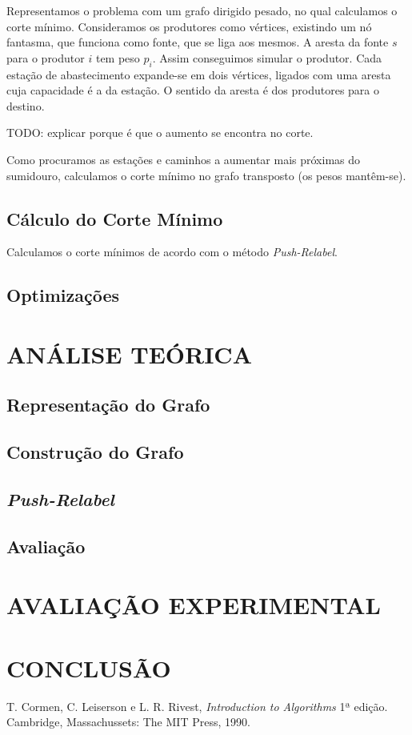 \documentclass[a4paper, 12pt, conference, portuguese]{ieeeconf}
\begin{document}
Representamos o problema com um grafo dirigido pesado, no qual
calculamos o corte mínimo. Consideramos os produtores como
vértices, existindo um nó fantasma, que funciona como fonte, que
se liga aos mesmos. A aresta da fonte $s$ para o produtor $i$ tem
peso $p_i$. Assim conseguimos simular o produtor. Cada estação de
abastecimento expande-se em dois vértices, ligados com uma aresta
cuja capacidade é a da estação. O sentido da aresta é dos produtores
para o destino.

TODO: explicar porque é que o aumento se encontra no corte.

Como procuramos as estações e caminhos a aumentar mais próximas
do sumidouro, calculamos o corte mínimo no grafo transposto (os
pesos mantêm-se).

\subsection{Cálculo do Corte Mínimo}
Calculamos o corte mínimos de acordo com o método
\textit{Push-Relabel}.
\subsection{Optimizações}

\section{ANÁLISE TEÓRICA}\label{theoric}

\subsection{Representação do Grafo}
\subsection{Construção do Grafo}
\subsection{\textit{Push-Relabel}}
\subsection{Avaliação}

\section{AVALIAÇÃO EXPERIMENTAL}\label{experimental}

\section{CONCLUSÃO}\label{conclusion}


\begin{thebibliography}{99}
   T. Cormen, C. Leiserson e L. R. Rivest, \textit{Introduction
    to Algorithms} 1ª edição. Cambridge, Massachussets: The MIT Press,
    1990.
\end{thebibliography}
\end{document}
